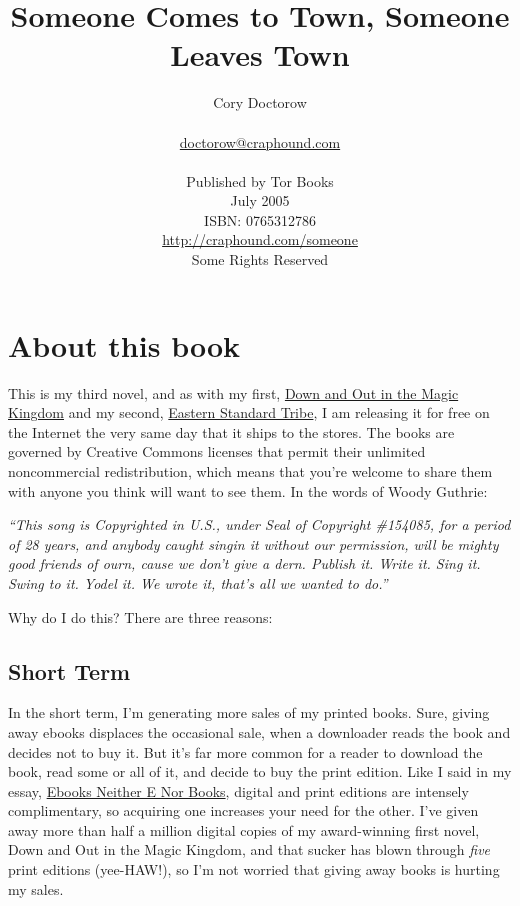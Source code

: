 \documentclass{article}
\begin{document}
\title{\Huge Someone Comes to Town, Someone Leaves Town}
\author
{
	{\Large Cory Doctorow} \\ \\
	\href{mailto:doctorow@craphound.com}{doctorow@craphound.com} \\ \\
	Published by Tor Books \\
	July 2005 \\
	ISBN:  0765312786 \\
	\href{http://craphound.com/someone}{http://craphound.com/someone} \\
	Some Rights Reserved \\
}
\date{}
\maketitle
\thispagestyle{empty}

\newpage



\section{About this book}
This is my third novel, and as with my first, 
\href{http://craphound.com/down}{Down and Out in the Magic Kingdom}
and my second, \href{http://craphound.com/est}{Eastern Standard
Tribe}, I am releasing it for free on the Internet the very same
day that it ships to the stores.  The books are governed by Creative
Commons licenses that permit their unlimited noncommercial
redistribution, which means that you're welcome to share them with
anyone you think will want to see them.  In the words of Woody
Guthrie: 

\textit{``This song is Copyrighted in U.S., under Seal of Copyright
\#154085, for a period of 28 years, and anybody caught singin it
without our permission, will be mighty good friends of ourn, cause we
don't give a dern.  Publish it.  Write it.  Sing it.  Swing to it. 
Yodel it.  We wrote it, that's all we wanted to do.''}

Why do I do this?  There are three reasons:
\subsection{Short Term}

In the short term, I'm generating more sales of my printed books. 
Sure, giving away ebooks displaces the occasional sale, when a
downloader reads the book and decides not to buy it.  But it's far
more common for a reader to download the book, read some or all of it,
and decide to buy the print edition.  Like I said in my essay, 
\href{http://craphound.com/ebooksneitherenorbooks.txt}{Ebooks Neither
E Nor Books}, digital and print editions are intensely
complimentary, so acquiring one increases your need for the other. 
I've given away more than half a million digital copies of my
award-winning first novel, Down and Out in the Magic Kingdom, and that
sucker has blown through \textit{five} print editions (yee-HAW!), so
I'm not worried that giving away books is hurting my sales.
\end{document}
